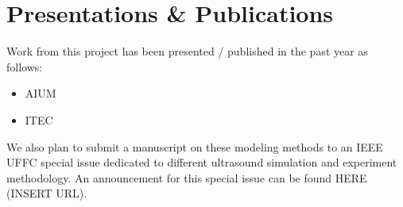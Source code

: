 \section{Presentations \& Publications}

Work from this project has been presented / published in the past year as follows:

\begin{itemize}
    \item AIUM
    \item ITEC
\end{itemize}

We also plan to submit a manuscript on these modeling methods to an IEEE UFFC
special issue dedicated to different ultrasound simulation and experiment
methodology.  An announcement for this special issue can be found HERE (INSERT
URL).
